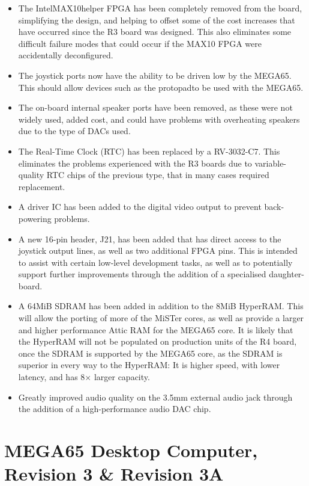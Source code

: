 \begin{itemize}
\item The Intel\tm MAX10\tm helper FPGA has been completely removed from the board, simplifying the design, and helping to offset some of the cost increases that have occurred since the R3 board was designed.  This also eliminates some difficult failure modes that could occur if the MAX10 FPGA were accidentally deconfigured.
\item The joystick ports now have the ability to be driven low by the MEGA65. This should allow devices such as the protopad\tm to be used with the MEGA65.
\item The on-board internal speaker ports have been removed, as these were not widely used, added cost, and could have problems with overheating speakers due to the type of DACs used.
\item The Real-Time Clock (RTC) has been replaced by a RV-3032-C7. This eliminates the problems experienced with the R3 boards due to variable-quality RTC chips of the previous type, that in many cases required replacement.
\item A driver IC has been added to the digital video output to prevent back-powering problems.
\item A new 16-pin header, J21, has been added that has direct access to the joystick output lines, as well as two additional FPGA pins. This is intended to assist with certain low-level development tasks, as well as to potentially support further improvements through the addition of a specialised daughter-board.
\item A 64MiB SDRAM has been added in addition to the 8MiB HyperRAM. This will allow the porting of more of the MiSTer cores, as well as provide a larger and higher performance Attic RAM for the MEGA65 core.  It is likely that the HyperRAM will not be populated on production units of the R4 board, once the SDRAM is supported by the MEGA65 core, as the SDRAM is superior in every way to the HyperRAM: It is higher speed, with lower latency, and has 8$\times$ larger capacity.
  \item Greatly improved audio quality on the 3.5mm external audio jack through the addition of a high-performance audio DAC chip.
\end{itemize}

\section{MEGA65 Desktop Computer, Revision 3 \& Revision 3A}

